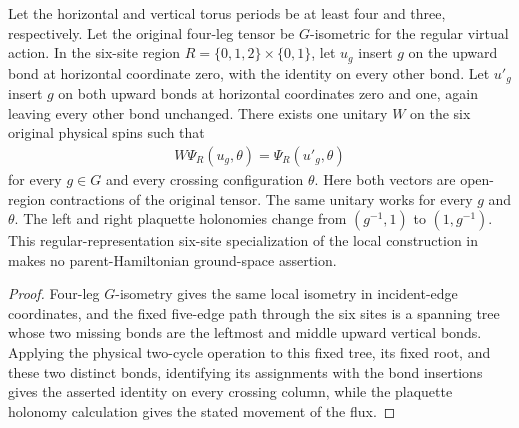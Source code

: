 \begin{lemma}%
    \label{thm:peps_torus_two_plaquette_physical_flux_move}
    \leanok
    Let the horizontal and vertical torus periods be at least four and three,
    respectively. Let the original four-leg tensor be $G$-isometric for the
    regular virtual action. In the six-site region
    $R=\{0,1,2\}\times\{0,1\}$, let $u_g$ insert $g$ on the upward bond at
    horizontal coordinate zero, with the identity on every other bond.
    Let $u'_g$ insert $g$ on both upward bonds at horizontal coordinates zero
    and one, again leaving every other bond unchanged.
    There exists one unitary $W$ on the six original physical spins such that
    \begin{align}
        W\Psi_R(u_g,\theta)=\Psi_R(u'_g,\theta)
    \end{align}
    for every $g\in G$ and every crossing configuration $\theta$.
    Here both vectors are open-region contractions of the original tensor.
    The same unitary works for every $g$ and $\theta$.
    The left and right plaquette holonomies change from $(g^{-1},1)$ to
    $(1,g^{-1})$.
    This regular-representation six-site specialization of the local
    construction in \cite[Theorem~6.16]{Schuch2010PEPS} makes no
    parent-Hamiltonian ground-space assertion.
\end{lemma}

\begin{proof}\leanok
    Four-leg $G$-isometry gives the same local isometry in incident-edge
    coordinates, and the fixed five-edge path through the six sites is a
    spanning tree whose two missing bonds are the leftmost and middle upward
    vertical bonds. Applying the physical two-cycle operation to this fixed
    tree, its fixed root, and these two distinct bonds, identifying its
    assignments with the bond insertions gives the asserted identity on every
    crossing column, while the plaquette holonomy calculation gives the
    stated movement of the flux.
\end{proof}
